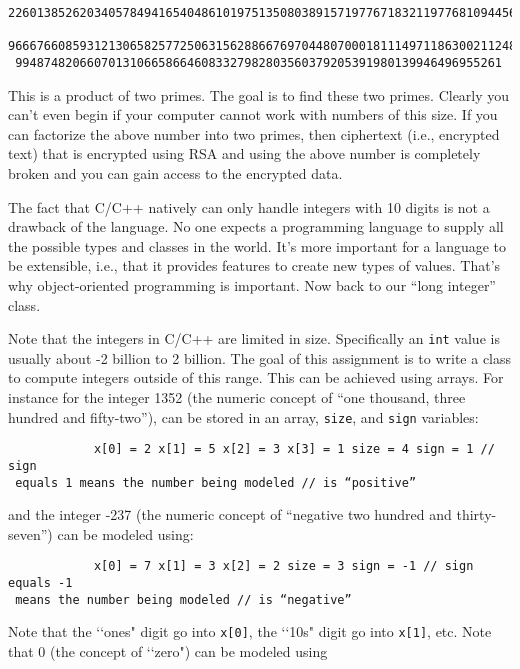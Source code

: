 \begin{Verbatim}
2260138526203405784941654048610197513508038915719776718321197768109445641817
 9666766085931213065825772506315628866769704480700018111497118630021124879281
 99487482066070131066586646083327982803560379205391980139946496955261
\end{Verbatim}

This is a product of two primes. The goal is to find these two primes. Clearly
you can't even begin if your computer cannot work with numbers of this size. If
you can factorize the above number into two primes, then ciphertext (i.e.,
encrypted text) that is encrypted using RSA and using the above number is
completely broken and you can gain access to the encrypted data.

The fact that C/C++ natively can only handle integers with 10 digits is not a
drawback of the language. No one expects a programming language to supply all
the possible types and classes in the world. It's more important for a language
to be extensible, i.e., that it provides features to create new types of
values.  That's why object-oriented programming is important.  Now back to our
“long integer” class.

Note that the integers in C/C++ are limited in size. Specifically an \verb!int!
value is usually about -2 billion to 2 billion. The goal of this assignment is
to write a class to compute integers outside of this range.  This can be
achieved using arrays. For instance for the integer 1352 (the numeric concept
of “one thousand, three hundred and fifty-two”), can be stored in an array,
\verb!size!, and \verb!sign! variables:

\begin{Verbatim}
            x[0] = 2 x[1] = 5 x[2] = 3 x[3] = 1 size = 4 sign = 1 // sign
 equals 1 means the number being modeled // is “positive”
\end{Verbatim}

and the integer -237 (the numeric concept of “negative two hundred and
thirty-seven”) can be modeled using:

\begin{Verbatim}
            x[0] = 7 x[1] = 3 x[2] = 2 size = 3 sign = -1 // sign equals -1
 means the number being modeled // is “negative”
\end{Verbatim}

Note that the \lq\lq ones" digit go into \verb!x[0]!, the \lq\lq 10s" digit go
into \verb!x[1]!, etc. Note that 0 (the concept of \lq\lq zero") can be modeled
using


